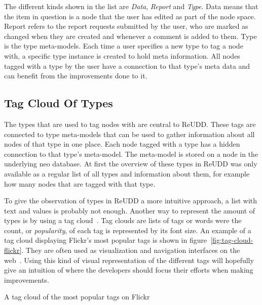 \documentclass[a4paper]{report}
\begin{document}
The different kinds shown in the list are \emph{Data}, \emph{Report} and \emph{Type}. Data means that the item in question is a node that the user has edited as part of the node space. Report refers to the report requests submitted by the user, who are marked as changed when they are created and whenever a comment is added to them. Type is the type meta-models. Each time a user specifies a new type to tag a node with, a specific type instance is created to hold meta information. All nodes tagged with a type by the user have a connection to that type's meta data and can benefit from the improvements done to it.

\subsection{Tag Cloud Of Types}
The types that are used to tag nodes with are central to ReUDD. These tags are connected to type meta-models that can be used to gather information about all nodes of that type in one place. Each node tagged with a type has a hidden connection to that type's meta-model. The meta-model is stored on a node in the underlying neo database. At first the overview of these types in ReUDD was only available as a regular list of all types and information about them, for example how many nodes that are tagged with that type.

To give the observation of types in ReUDD a more intuitive approach, a list with text and values is probably not enough. Another way to represent the amount of types is by using a tag cloud~\cite{Viegas-Wattenberg:2008}. Tag clouds are lists of tags or words were the count, or \emph{popularity}, of each tag is represented by its font size. An example of a tag cloud displaying Flickr's most popular tags is shown in figure~\ref{fig:tag-cloud-flickr}. They are often used as visualization and navigation interfaces on the web~\cite{Lohmann-et-al:2009}. Using this kind of visual representation of the different tags will hopefully give an intuition of where the developers should focus their efforts when making improvements.

	{A tag cloud of the most popular tags on Flickr}
\end{document}
